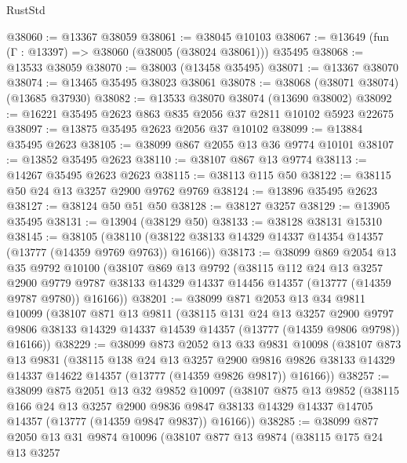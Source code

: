 \begin{lexlean}{RustStd}
\begin{coremodule}
@38060 := @13367 @38059
@38061 := @38045 @10103
@38067 := @13649 (fun (Γ : @13397) => @38060 (@38005 (@38024 @38061))) @35495
@38068 := @13533 @38059
@38070 := @38003 (@13458 @35495)
@38071 := @13367 @38070
@38074 := @13465 @35495 @38023 @38061
@38078 := @38068 (@38071 @38074) (@13685 @37930)
@38082 := @13533 @38070 @38074 (@13690 @38002)
@38092 := @16221 @35495 @2623 @863 @835 @2056 @37 @2811 @10102 @5923 @22675
@38097 := @13875 @35495 @2623 @2056 @37 @10102
@38099 := @13884 @35495 @2623
@38105 := @38099 @867 @2055 @13 @36 @9774 @10101
@38107 := @13852 @35495 @2623
@38110 := @38107 @867 @13 @9774
@38113 := @14267 @35495 @2623 @2623
@38115 := @38113 @115 @50
@38122 := @38115 @50 @24 @13 @3257 @2900 @9762 @9769
@38124 := @13896 @35495 @2623
@38127 := @38124 @50 @51 @50
@38128 := @38127 @3257
@38129 := @13905 @35495
@38131 := @13904 (@38129 @50)
@38133 := @38128 @38131 @15310
@38145 := @38105
    (@38110 (@38122 @38133 @14329 @14337 @14354 @14357 (@13777 (@14359 @9769 @9763)) @16166))
@38173 := @38099
    @869
    @2054
    @13
    @35
    @9792
    @10100
    (@38107
      @869
      @13
      @9792
      (@38115
        @112
        @24
        @13
        @3257
        @2900
        @9779
        @9787
        @38133
        @14329
        @14337
        @14456
        @14357
        (@13777 (@14359 @9787 @9780))
        @16166))
@38201 := @38099
    @871
    @2053
    @13
    @34
    @9811
    @10099
    (@38107
      @871
      @13
      @9811
      (@38115
        @131
        @24
        @13
        @3257
        @2900
        @9797
        @9806
        @38133
        @14329
        @14337
        @14539
        @14357
        (@13777 (@14359 @9806 @9798))
        @16166))
@38229 := @38099
    @873
    @2052
    @13
    @33
    @9831
    @10098
    (@38107
      @873
      @13
      @9831
      (@38115
        @138
        @24
        @13
        @3257
        @2900
        @9816
        @9826
        @38133
        @14329
        @14337
        @14622
        @14357
        (@13777 (@14359 @9826 @9817))
        @16166))
@38257 := @38099
    @875
    @2051
    @13
    @32
    @9852
    @10097
    (@38107
      @875
      @13
      @9852
      (@38115
        @166
        @24
        @13
        @3257
        @2900
        @9836
        @9847
        @38133
        @14329
        @14337
        @14705
        @14357
        (@13777 (@14359 @9847 @9837))
        @16166))
@38285 := @38099
    @877
    @2050
    @13
    @31
    @9874
    @10096
    (@38107
      @877
      @13
      @9874
      (@38115
        @175
        @24
        @13
        @3257

\end{coremodule}
\end{lexlean}
